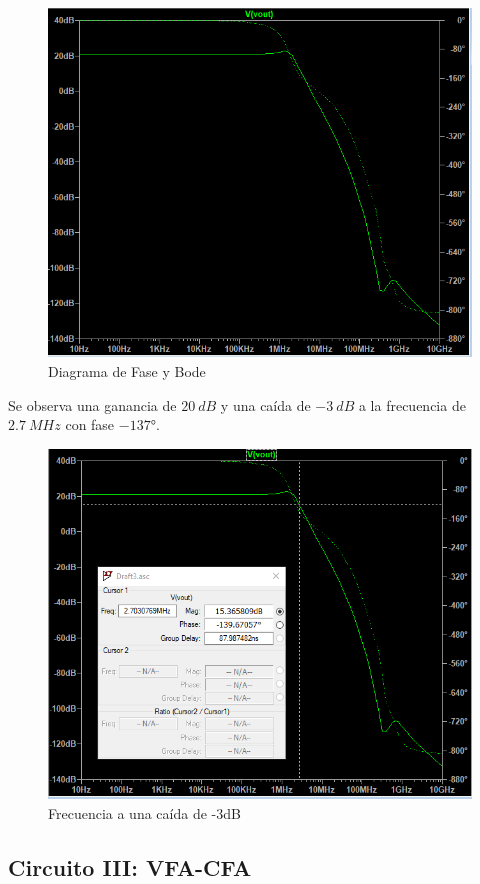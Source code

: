 \begin{figure}[H]
    \centering
    \includegraphics[width=0.7\linewidth]{VFA-CFA-Bode.png}
    \caption{Diagrama de Fase y Bode}
    \label{fig:enter-label}
\end{figure}

\hspace{1mm} Se observa una ganancia de \(20~dB\) y una caída de \(-3~dB\) a la frecuencia de \(2.7~MHz\) con fase \(-137°\).

\begin{figure}[H]
    \centering
    \includegraphics[width=0.7\linewidth]{VFA-CFA-Bode2.png}
    \caption{Frecuencia a una caída de -3dB}
    \label{fig:enter-label}
\end{figure}









\newpage
\subsection{Circuito III: VFA-CFA}

